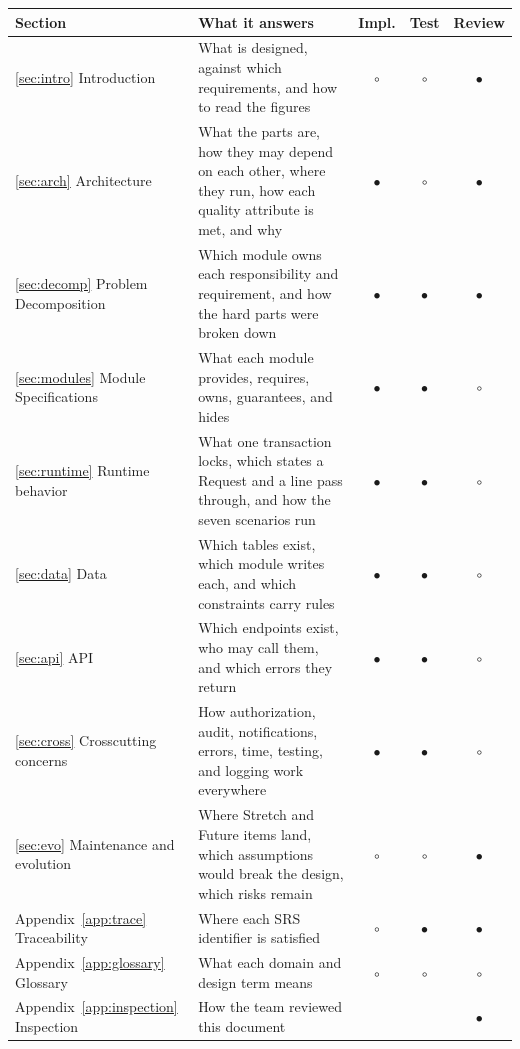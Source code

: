 {\small\renewcommand{\arraystretch}{1.08}
\begin{tabularx}{\textwidth}{@{}L{4.2cm}Yccc@{}}
\toprule
\textbf{Section} & \textbf{What it answers} & \textbf{Impl.} & \textbf{Test} & \textbf{Review} \\
\midrule
\ref{sec:intro} Introduction & What is designed, against which requirements, and how to read the figures & $\circ$ & $\circ$ & $\bullet$ \\
\ref{sec:arch} Architecture & What the parts are, how they may depend on each other, where they run, how each quality attribute is met, and why & $\bullet$ & $\circ$ & $\bullet$ \\
\ref{sec:decomp} Problem Decomposition & Which module owns each responsibility and requirement, and how the hard parts were broken down & $\bullet$ & $\bullet$ & $\bullet$ \\
\ref{sec:modules} Module Specifications & What each module provides, requires, owns, guarantees, and hides & $\bullet$ & $\bullet$ & $\circ$ \\
\ref{sec:runtime} Runtime behavior & What one transaction locks, which states a Request and a line pass through, and how the seven scenarios run & $\bullet$ & $\bullet$ & $\circ$ \\
\ref{sec:data} Data & Which tables exist, which module writes each, and which constraints carry rules & $\bullet$ & $\bullet$ & $\circ$ \\
\ref{sec:api} API & Which endpoints exist, who may call them, and which errors they return & $\bullet$ & $\bullet$ & $\circ$ \\
\ref{sec:cross} Crosscutting concerns & How authorization, audit, notifications, errors, time, testing, and logging work everywhere & $\bullet$ & $\bullet$ & $\circ$ \\
\ref{sec:evo} Maintenance and evolution & Where Stretch and Future items land, which assumptions would break the design, which risks remain & $\circ$ & $\circ$ & $\bullet$ \\
Appendix~\ref{app:trace} Traceability & Where each SRS identifier is satisfied & $\circ$ & $\bullet$ & $\bullet$ \\
Appendix~\ref{app:glossary} Glossary & What each domain and design term means & $\circ$ & $\circ$ & $\circ$ \\
Appendix~\ref{app:inspection} Inspection & How the team reviewed this document & & & $\bullet$ \\
\bottomrule
\end{tabularx}
}

